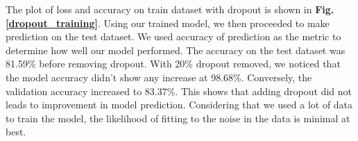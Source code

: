 \documentclass[11pt,a4paper]{article}
\begin{document}
\begin{table}[h!]
\centering
{}
\caption{Result of model training and validation accuracy with epochs}
\label{tab:train_loss}
\end{table}

The plot of loss and accuracy on train dataset with dropout is shown in \textbf{Fig. \ref{dropout_training}}.  Using our trained model, we then proceeded to make prediction on the test dataset. We used accuracy of prediction as the metric to determine how well our model performed. The accuracy on the test dataset was 81.59\% before removing dropout. With 20\% dropout removed, we noticed that the model accuracy didn't show any increase at 98.68\%.  Conversely, the validation accuracy increased to 83.37\%. This shows that adding dropout did not leads to improvement in model prediction.  Considering that we used a lot of data to train the model, the likelihood of fitting to the noise in the data is minimal at best.

\begin{table}[h!]
\centering
{}
\caption{Result of model training and validation accuracy after dropout with epochs}
\label{tab:dropout_train_loss}
\end{table}
\end{document}
